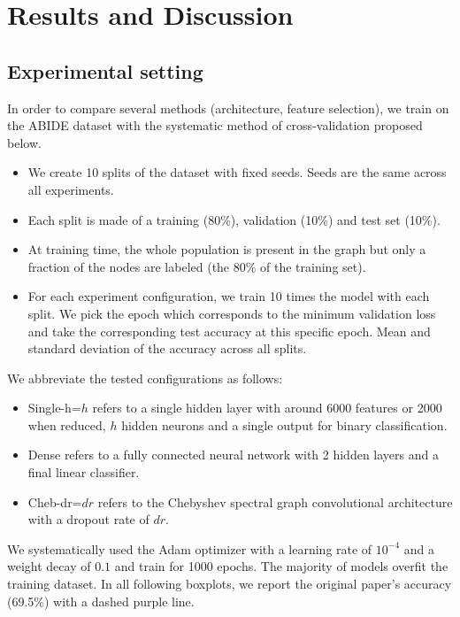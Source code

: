 \section{Results and Discussion}



\subsection{Experimental setting}
In order to compare several methods (architecture, feature selection), we train on the ABIDE dataset with the systematic method of cross-validation proposed below.
\begin{itemize}
	\item We create 10 splits of the dataset with fixed seeds. Seeds are the same across all experiments.
	\item Each split is made of a training (80\%), validation (10\%) and test set (10\%).
	\item At training time, the whole population is present in the graph but only a fraction of the nodes are labeled (the 80\% of the training set).
	\item For each experiment configuration, we train 10 times the model with each split.
	We pick the epoch which corresponds to the minimum validation loss and take the corresponding test accuracy at this specific epoch. Mean and standard deviation of the accuracy across all splits.
\end{itemize}

We abbreviate the tested configurations as follows:
\begin{itemize}
	\item Single-h=$h$ refers to a single hidden layer with around 6000 features or 2000 when reduced, $h$ hidden neurons and a single output for binary classification.
	\item Dense refers to a fully connected neural network with 2 hidden layers and a final linear classifier.
	\item Cheb-dr=$dr$ refers to the Chebyshev spectral graph convolutional \cite{Defferrard2016} architecture with a dropout rate of $dr$.
\end{itemize}

We systematically used the Adam optimizer with a learning rate of $10^{-4}$ and a weight decay of $0.1$ and train for 1000 epochs.
The majority of models overfit the training dataset.
In all following boxplots, we report the original paper's accuracy (69.5\%) with a dashed purple line.

